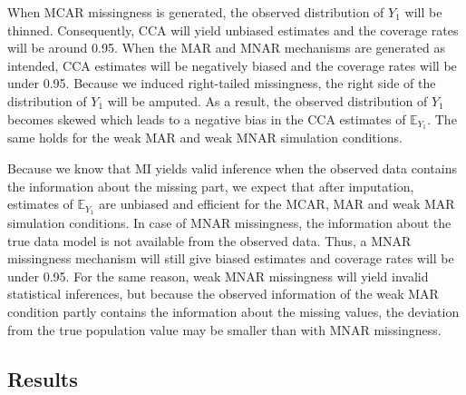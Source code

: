 \documentclass[11pt,a4paper]{article}
\begin{document}
When MCAR missingness is generated, the observed distribution of $Y_1$ will be thinned. Consequently, CCA will yield unbiased estimates and the coverage rates will be around 0.95. When the MAR and MNAR mechanisms are generated as intended, CCA estimates will be negatively biased and the coverage rates will be under 0.95. Because we induced right-tailed missingness, the right side of the distribution of $Y_1$ will be amputed. As a result, the observed distribution of $Y_1$ becomes skewed which leads to a negative bias in the CCA estimates of $\mathbb{E}_{Y_1}$. The same holds for the weak MAR and weak MNAR simulation conditions. 

Because we know that MI yields valid inference when the observed data contains the information about the missing part, we expect that after imputation, estimates of $\mathbb{E}_{Y_1}$ are unbiased and efficient for the MCAR, MAR and weak MAR simulation conditions. In case of MNAR missingness, the information about the true data model is not available from the observed data. Thus, a MNAR missingness mechanism will still give biased estimates and coverage rates will be under 0.95. For the same reason, weak MNAR missingness will yield invalid statistical inferences, but because the observed information of the weak MAR condition partly contains the information about the missing values, the deviation from the true population value may be smaller than with MNAR missingness. 

\subsection{Results}
\end{document}
